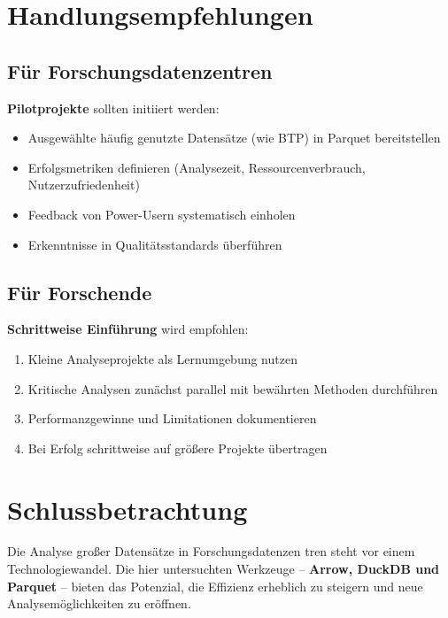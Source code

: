 \documentclass[
  ngerman,
  10pt,
  letterpaper,
  twocolumn]{book}
\providecommand{\tightlist}{%
  \setlength{\itemsep}{0pt}\setlength{\parskip}{0pt}}
\begin{document}
\section{Handlungsempfehlungen}\label{handlungsempfehlungen}

\subsection{Für
Forschungsdatenzentren}\label{fuxfcr-forschungsdatenzentren}

\textbf{Pilotprojekte} sollten initiiert werden:

\begin{itemize}
\tightlist
\item
  Ausgewählte häufig genutzte Datensätze (wie BTP) in Parquet
  bereitstellen
\item
  Erfolgsmetriken definieren (Analysezeit, Ressourcenverbrauch,
  Nutzerzufriedenheit)
\item
  Feedback von Power-Usern systematisch einholen
\item
  Erkenntnisse in Qualitätsstandards überführen
\end{itemize}

\subsection{Für Forschende}\label{fuxfcr-forschende}

\textbf{Schrittweise Einführung} wird empfohlen:

\begin{enumerate}
\def\labelenumi{\arabic{enumi}.}
\tightlist
\item
  Kleine Analyseprojekte als Lernumgebung nutzen
\item
  Kritische Analysen zunächst parallel mit bewährten Methoden
  durchführen
\item
  Performanzgewinne und Limitationen dokumentieren
\item
  Bei Erfolg schrittweise auf größere Projekte übertragen
\end{enumerate}

\section{Schlussbetrachtung}\label{schlussbetrachtung}

Die Analyse großer Datensätze in Forschungsdatenzen tren steht vor einem
Technologiewandel. Die hier untersuchten Werkzeuge -- \textbf{Arrow,
DuckDB und Parquet} -- bieten das Potenzial, die Effizienz erheblich zu
steigern und neue Analysemöglichkeiten zu eröffnen.
\end{document}

